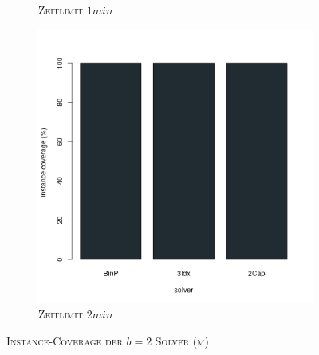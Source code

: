 \begin{figure}[H]
\begin{subfigure}[b]{0.3\textwidth}
\caption{\textsc{Zeitlimit} $1min$}
\label{fig:instance_cov_b=2_m_b}
\end{subfigure}
\hfill
\begin{subfigure}[b]{0.3\textwidth}
\centering
\includegraphics[width=1.2\textwidth]{img/solver_instance_coverage_b=2_m_120s.png}
\caption{\textsc{Zeitlimit} $2min$}
\label{fig:instance_cov_b=2_m_c}
\end{subfigure}
\caption{\textsc{Instance-Coverage der $b=2$ Solver (m)}}
\label{fig:instance_cov_b=2}
\end{figure}


